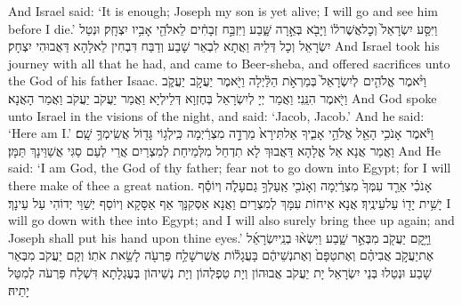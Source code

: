 {And Israel said: ‘It is enough; Joseph my son is yet alive; I will go and see him before I die.’}{}
\newperek
{}%
{וַיִּסַּ֤ע יִשְׂרָאֵל֙ וְכׇל\maqqaf אֲשֶׁר\maqqaf ל֔וֹ וַיָּבֹ֖א בְּאֵ֣רָה שָּׁ֑בַע וַיִּזְבַּ֣ח זְבָחִ֔ים לֵאלֹהֵ֖י אָבִ֥יו יִצְחָֽק׃}
{וּנְטַל יִשְׂרָאֵל וְכָל דְּלֵיהּ וַאֲתָא לִבְאֵר שָׁבַע וְדַבַּח דִּבְחִין לֵאלָהָא דַּאֲבוּהִי יִצְחָק׃}
{And Israel took his journey with all that he had, and came to Beer-sheba, and offered sacrifices unto the God of his father Isaac.}{}
{וַיֹּ֨אמֶר אֱלֹהִ֤ים \pasek  לְיִשְׂרָאֵל֙ בְּמַרְאֹ֣ת הַלַּ֔יְלָה וַיֹּ֖אמֶר יַעֲקֹ֣ב \pasek  יַעֲקֹ֑ב וַיֹּ֖אמֶר הִנֵּֽנִי׃}
{וַאֲמַר יְיָ לְיִשְׂרָאֵל בְּחֶזְוָא דְּלֵילְיָא וַאֲמַר יַעֲקֹב יַעֲקֹב וַאֲמַר הָאֲנָא׃}
{And God spoke unto Israel in the visions of the night, and said: ‘Jacob, Jacob.’ And he said: ‘Here am I.’}{}
{וַיֹּ֕אמֶר אָנֹכִ֥י הָאֵ֖ל אֱלֹהֵ֣י אָבִ֑יךָ אַל\maqqaf תִּירָא֙ מֵרְדָ֣ה מִצְרַ֔יְמָה כִּֽי\maqqaf לְג֥וֹי גָּד֖וֹל אֲשִֽׂימְךָ֥ שָֽׁם׃}
{וַאֲמַר אֲנָא אֵל אֱלָהָא דַּאֲבוּךְ לָא תִדְחַל מִלְּמֵיחַת לְמִצְרַיִם אֲרֵי לְעַם סַגִּי אֲשַׁוֵּינָךְ תַּמָּן׃}
{And He said: ‘I am God, the God of thy father; fear not to go down into Egypt; for I will there make of thee a great nation.}{}
{אָנֹכִ֗י אֵרֵ֤ד עִמְּךָ֙ מִצְרַ֔יְמָה וְאָנֹכִ֖י אַֽעַלְךָ֣ גַם\maqqaf עָלֹ֑ה וְיוֹסֵ֕ף יָשִׁ֥ית יָד֖וֹ עַל\maqqaf עֵינֶֽיךָ׃}
{אֲנָא אֵיחוֹת עִמָּךְ לְמִצְרַיִם וַאֲנָא אַסְּקִנָּךְ אַף אַסָּקָא וְיוֹסֵף יְשַׁוֵּי יְדוֹהִי עַל עֵינָךְ׃}
{I will go down with thee into Egypt; and I will also surely bring thee up again; and Joseph shall put his hand upon thine eyes.’}{}
{וַיָּ֥קׇם יַעֲקֹ֖ב מִבְּאֵ֣ר שָׁ֑בַע וַיִּשְׂא֨וּ בְנֵֽי\maqqaf יִשְׂרָאֵ֜ל אֶת\maqqaf יַעֲקֹ֣ב אֲבִיהֶ֗ם וְאֶת\maqqaf טַפָּם֙ וְאֶת\maqqaf נְשֵׁיהֶ֔ם בָּעֲגָל֕וֹת אֲשֶׁר\maqqaf שָׁלַ֥ח פַּרְעֹ֖ה לָשֵׂ֥את אֹתֽוֹ׃}
{וְקָם יַעֲקֹב מִבְּאֵר שָׁבַע וּנְטַלוּ בְּנֵי יִשְׂרָאֵל יָת יַעֲקֹב אֲבוּהוֹן וְיָת טַפְלְהוֹן וְיָת נְשֵׁיהוֹן בְּעֶגְלָתָא דִּשְׁלַח פַּרְעֹה לְמִטַּל יָתֵיהּ׃}
